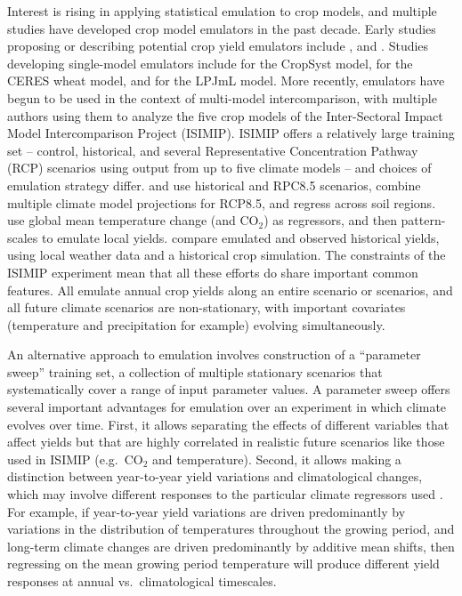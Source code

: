 \documentclass[gmd, manuscript]{copernicus} %
\begin{document}
Interest is rising in applying statistical emulation to crop models, and multiple studies have developed crop model emulators in the past decade.
Early studies proposing or describing potential crop yield emulators include \citet{Howden2005, raisen2006, Lobell2010}, and \citet{Ferrise2011}.
Studies developing single-model emulators include \citet{Holzkamper2012} for the CropSyst model, \citet{RUANE2013a} for the CERES wheat model, and \citet{Oyebamiji15} for the LPJmL model. 
More recently, emulators have begun to be used in the context of multi-model intercomparison, with multiple authors \citep{BLANC2015, BLANC2017, Ostberg2018, Mistry2017}  using them to analyze the five crop models  of the Inter-Sectoral Impact Model Intercomparison Project (ISIMIP). ISIMIP offers a relatively large training set --  control, historical, and several Representative Concentration Pathway (RCP) scenarios using output from up to five climate models \citep{Warszawski3228, Frieler2017} -- and choices of emulation strategy differ.
\citet{BLANC2015} and \citet{BLANC2017} use historical and RPC8.5 scenarios, combine multiple climate model projections for RCP8.5, and regress across soil regions. 
\citet{Ostberg2018} use global mean temperature change (and CO$_2$) as regressors, and then pattern-scales to emulate local yields. 
\citet{Mistry2017} compare emulated and observed historical yields, using local weather data and a historical crop simulation. 
The constraints of the ISIMIP experiment mean that all these efforts do share important common features. 
All emulate annual crop yields along an entire scenario or scenarios, and all future climate scenarios are non-stationary, with important covariates (temperature and precipitation for example) evolving simultaneously. 

An alternative approach to emulation involves construction of a ``parameter sweep'' training set, a collection of multiple stationary scenarios that systematically cover a range of input parameter values.
A parameter sweep offers several important advantages for emulation over an experiment in which climate evolves over time. 
First, it allows separating the effects of different variables that affect yields but that are highly correlated in realistic future scenarios like those used in ISIMIP (e.g.\ CO$_2$ and temperature). 
Second, it allows making a distinction between year-to-year yield variations and climatological changes, which may involve different responses to the particular climate regressors used \citep[e.g.][]{Ruane2016}. 
For example, if year-to-year yield variations are driven predominantly by variations in the distribution of temperatures throughout the growing period, and long-term climate changes are driven predominantly by additive mean shifts, then regressing on the mean growing period temperature will produce different yield responses at annual vs.\ climatological timescales.  
\end{document}

